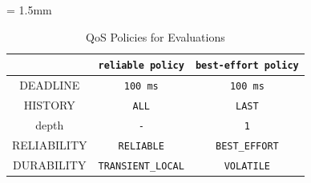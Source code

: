 \documentclass{sig-alternate-05-2015}
\begin{document}
\renewcommand{\arraystretch}{1.0}
\begin{table}[t]
\caption{\label{tab:orgtable2}
QoS Policies for Evaluations}
\centering
\tabcolsep = 1.5mm              %
\begin{tabular}{c|cc}
\hline
 & \textbf{\texttt{reliable policy}} & \textbf{\texttt{best-effort policy}}\\
\hline
\hline
DEADLINE & \texttt{100 ms} & \texttt{100 ms}\\
HISTORY & \texttt{ALL} & \texttt{LAST}\\
depth & \texttt{-} & \texttt{1}\\
RELIABILITY & \texttt{RELIABLE} & \texttt{BEST\_EFFORT}\\
DURABILITY & \texttt{TRANSIENT\_LOCAL} & \texttt{VOLATILE}\\
\hline
\end{tabular}
\end{table}

\newcommand*{\x}[0]{\checkmark} %
\newcommand*{\y}[1]{$\blacktriangle^{#1}$} %
\newcommand*{\z}[1]{$\triangle^{#1}$} %
\end{document}
